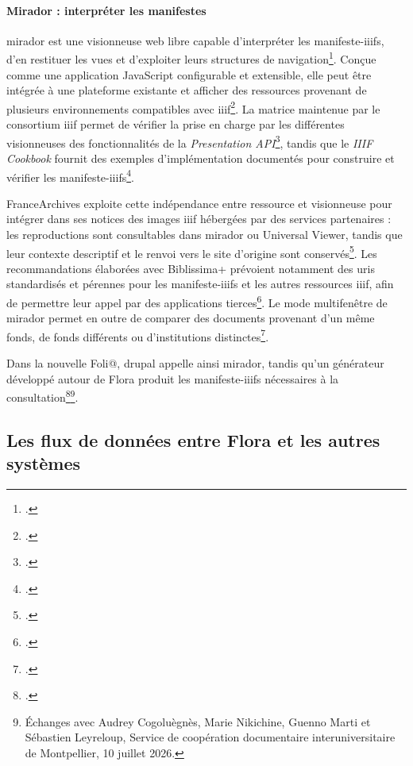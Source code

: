 \paragraph{Mirador : interpréter les manifestes}

\gls{mirador} est une visionneuse web libre capable d'interpréter les \glspl{manifeste-iiif}, d'en restituer les vues et d'exploiter leurs structures de navigation\footcite{Mirador}. Conçue comme une application JavaScript configurable et extensible, elle peut être intégrée à une plateforme existante et afficher des ressources provenant de plusieurs environnements compatibles avec \gls{iiif}\footcite{WolffProbstBodenschatz2024}. La matrice maintenue par le consortium \gls{iiif} permet de vérifier la prise en charge par les différentes visionneuses des fonctionnalités de la \emph{Presentation API}\footcite{IIIFViewerMatrix3}, tandis que le \emph{IIIF Cookbook} fournit des exemples d'implémentation documentés pour construire et vérifier les \glspl{manifeste-iiif}\footcite{IIIFCookbook}.

FranceArchives exploite cette indépendance entre ressource et visionneuse pour intégrer dans ses notices des images \gls{iiif} hébergées par des services partenaires : les reproductions sont consultables dans \gls{mirador} ou Universal Viewer, tandis que leur contexte descriptif et le renvoi vers le site d'origine sont conservés\footcite{FranceArchivesIIIF2026}. Les recommandations élaborées avec Biblissima+ prévoient notamment des \glspl{uri} standardisés et pérennes pour les \glspl{manifeste-iiif} et les autres ressources \gls{iiif}, afin de permettre leur appel par des applications tierces\footcite{BiblissimaFranceArchivesIIIF2023}. Le mode multifenêtre de \gls{mirador} permet en outre de comparer des documents provenant d'un même fonds, de fonds différents ou d'institutions distinctes\footcite{FranceArchivesIIIF2026}.

Dans la nouvelle Foli@, \gls{drupal} appelle ainsi \gls{mirador}, tandis qu'un générateur développé autour de Flora produit les \glspl{manifeste-iiif} nécessaires à la consultation\footcite{Vanjak2026}\footnote{Échanges avec Audrey Cogoluègnès, Marie Nikichine, Guenno Marti et Sébastien Leyreloup, Service de coopération documentaire interuniversitaire de Montpellier, 10 juillet 2026.}.


\subsection{Les flux de données entre Flora et les autres systèmes}

